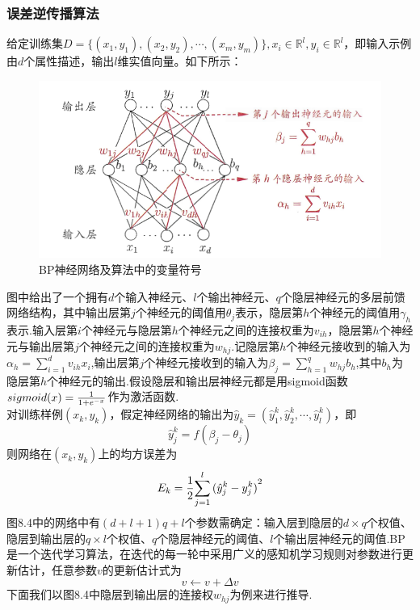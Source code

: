 \documentclass[openany]{progbookcn}
\begin{document}
\subsubsection{误差逆传播算法}
\indent 给定训练集$D=\{(x_1,y_1),(x_2,y_2),\cdots,(x_m,y_m) \},x_i\in \mathbb{R}^l,y_i\in \mathbb{R}^l$，即输入示例由$d$个属性描述，输出$l$维实值向量。如下所示：
\begin{figure}[H]
\centering
\includegraphics[width=0.6 \textwidth]{figs/chapter8/BP神经网络}
\caption{BP神经网络及算法中的变量符号}
\end{figure}
\indent 图中给出了一个拥有$d$个输入神经元、$l$个输出神经元、$q$个隐层神经元的多层前馈网络结构，其中输出层第$j$个神经元的阈值用$\theta_j$表示，隐层第$h$个神经元的阈值用$\gamma_h$表示.输入层第$i$个神经元与隐层第$h$个神经元之间的连接权重为$v_{ih}$，隐层第$h$个神经元与输出层第$j$个神经元之间的连接权重为$w_{hj}$.记隐层第$h$个神经元接收到的输入为$\alpha_h=\sum\limits_{i = 1}^d {{v_{ih}}{x_i}}$,输出层第$j$个神经元接收到的输入为$\beta_j=\sum\limits_{h = 1}^q {{w_{hj}}{b_h}}$,其中$b_h$为隐层第$h$个神经元的输出.假设隐层和输出层神经元都是用sigmoid函数$sigmoid(x)={1\over {1+{e^{-x}}}}$作为激活函数.\\
\indent 对训练样例$(x_k,y_k)$，假定神经网络的输出为${\hat y}_k=\left({\hat y}_1^k,{\hat y}_2^k,\cdots,{\hat y}_l^k\right)$，即
\begin{equation}
{\hat y}_j^k=f{\left( \beta_j-\theta_j\right)}
\end{equation}
\indent 则网络在$(x_k,y_k)$上的均方误差为
\begin{equation}
E_k={1\over 2}{\sum\limits_{j = 1}^l {{{(\hat y_j^k - y_j^k)}^2}} }
\end{equation}
\indent 图8.4中的网络中有$(d+l+1)q+l$个参数需确定：输入层到隐层的$d\times q$个权值、隐层到输出层的$q\times l$个权值、$q$个隐层神经元的阈值、$l$个输出层神经元的阈值.BP是一个迭代学习算法，在迭代的每一轮中采用广义的感知机学习规则对参数进行更新估计，任意参数$v$的更新估计式为
\begin{equation}
v\leftarrow v+\Delta v
\end{equation}
\indent 下面我们以图8.4中隐层到输出层的连接权$w_{hj}$为例来进行推导.\\
\end{document}
